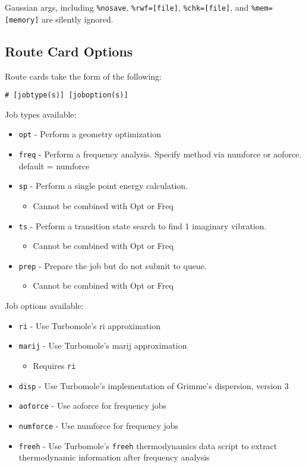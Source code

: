 Gaussian args, including \texttt{\%nosave}, \texttt{\%rwf={[}file{]}}, \texttt{\%chk={[}file{]}}, and \texttt{\%mem={[}memory{]}} are silently ignored.

\subsection{Route Card Options}

Route cards take the form of the following:

\texttt{\# {[}jobtype(s){]} {[}joboption(s){]}}

Job types available:

\begin{itemize}
\item \texttt{opt} - Perform a geometry optimization
\item \texttt{freq} - Perform a frequency analysis. Specify method via numforce or aoforce. default = numforce
\item \texttt{sp} - Perform a single point energy calculation.
  \begin{itemize}
    \item Cannot be combined with Opt or Freq
  \end{itemize}
\item \texttt{ts} - Perform a transition state search to find 1 imaginary vibration. 
  \begin{itemize}
    \item Cannot be combined with Opt or Freq
  \end{itemize}
\item \texttt{prep} - Prepare the job but do not submit to queue.
  \begin{itemize}
    \item Cannot be combined with Opt or Freq
  \end{itemize}
\end{itemize}

Job options available:

\begin{itemize}
\item \texttt{ri} - Use Turbomole's ri approximation
\item \texttt{marij} - Use Turbomole's marij approximation 
  \begin{itemize}
    \item Requires \texttt{ri}
  \end{itemize}
\item \texttt{disp} - Use Turbomole's implementation of Grimme's dispersion, version 3
\item \texttt{aoforce} - Use aoforce for frequency jobs
\item \texttt{numforce} - Use numforce for frequency jobs
\item \texttt{freeh} - Use Turbomole's \texttt{freeh} thermodynamics data script to extract thermodynamic information after frequency analysis
\end{itemize}

